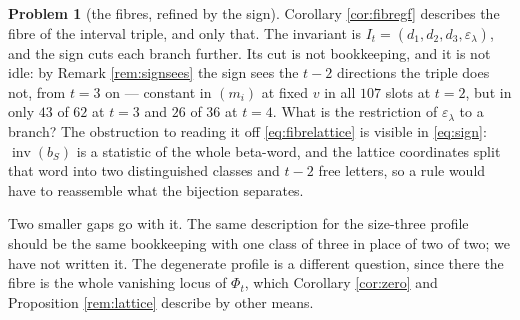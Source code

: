 \documentclass[11pt,reqno]{amsart}
\theoremstyle{plain}
\theoremstyle{definition}
\newtheorem{problem}[theorem]{Problem}
\newcommand{\inv}{\operatorname{inv}}
\begin{document}
\begin{problem}[the fibres, refined by the sign]\label{prob:fibres}
Corollary \ref{cor:fibregf} describes the fibre of the interval triple, and only that. The invariant
is $I_t=(d_1,d_2,d_3,\varepsilon_\lambda)$, and the sign cuts each branch further. Its cut is not
bookkeeping, and it is not idle: by Remark \ref{rem:signsees} the sign sees the $t-2$ directions the
triple does not, from $t=3$ on --- constant in $(m_i)$ at fixed $v$ in all $107$ slots at $t=2$, but
in only $43$ of $62$ at $t=3$ and $26$ of $36$ at $t=4$. What is the restriction of
$\varepsilon_\lambda$ to a branch? The obstruction to reading it off \eqref{eq:fibrelattice} is
visible in \eqref{eq:sign}: $\inv(b_S)$ is a statistic of the whole beta-word, and the lattice
coordinates split that word into two distinguished classes and $t-2$ free letters, so a rule would
have to reassemble what the bijection separates.

Two smaller gaps go with it. The same description for the size-three profile should be the same
bookkeeping with one class of three in place of two of two; we have not written it. The degenerate
profile is a different question, since there the fibre is the whole vanishing locus of $\Phi_t$,
which Corollary \ref{cor:zero} and Proposition \ref{rem:lattice} describe by other means.
\end{problem}
\end{document}
